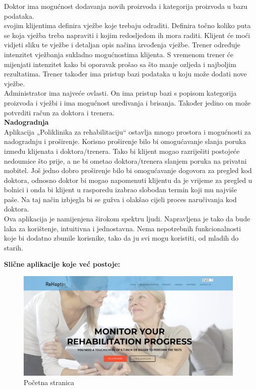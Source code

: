 		Doktor ima mogućnost dodavanja novih proizvoda i kategorija proizvoda u bazu podataka.\\	
		
		svojim klijentima definira vježbe koje trebaju odraditi. Definira točno koliko puta se koja vježba treba napraviti i kojim redosljedom ih mora raditi. Klijent će moći vidjeti sliku te vježbe i detaljan opis načina izvođenja vježbe. Trener određuje intenzitet vježbanja sukladno mogućnostima klijenta. S vremenom trener će mijenjati intenzitet kako bi oporavak prošao sa što manje ozljeda i najboljim rezultatima. Trener također ima pristup bazi podataka u koju može dodati nove vježbe.\\
		
		Administrator ima najveće ovlasti. On ima pristup bazi s  popisom kategorija proizvoda i vježbi i ima mogućnost uređivanja i brisanja. Također jedino on može potvrditi račun za doktora i trenera.\\
		
		\noindent \textbf{Nadogradnja}\\
		Aplikacija „Poliklinika za rehabilitaciju“ ostavlja mnogo prostora i mogućnosti za nadogradnju i proširenje. Korisno proširenje bilo bi omogućavanje slanja poruka između klijenata i doktora/trenera. Tako bi klijent mogao razriješiti postojeće nedoumice što prije, a ne bi ometao doktora/trenera slanjem poruka na privatni mobitel. Još jedno dobro proširenje bilo bi omogućavanje dogovora za pregled kod doktora, odnosno doktor bi mogao napomenuti klijentu da je vrijeme za pregled u bolnici i onda bi klijent u rasporedu izabrao slobodan termin koji mu najviše paše. Na taj način izbjegla bi se gužva i olakšao cijeli proces naručivanja kod doktora.\\
		
		Ova aplikacija je namijenjena širokom spektru ljudi. Napravljena je tako da bude laka za korištenje, intuitivna i jednostavna. Nema nepotrebnih funkcionalnosti koje bi dodatno zbunile korisnike, tako da ju svi mogu koristiti, od mladih do starih.
		
		\newpage
		
		\noindent \textbf{Slične aplikacije koje već postoje:}\\
		
		\begin{figure}[h]
			\centering
			\includegraphics[scale=0.3]{rehaptix1.png}
			\caption{Početna stranica}
		\end{figure}
	
